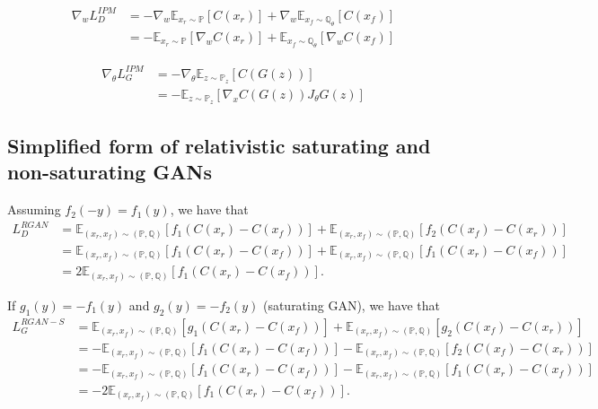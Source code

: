 \documentclass{article}
\begin{document}
\begin{align*}
\nabla_{w}L_D^{IPM} &= -\nabla_{w} \mathbb{E}_{x_r \sim \mathbb{P}} [C(x_r)] + \nabla_{w} \mathbb{E}_{x_f \sim \mathbb{Q_\theta}}[C(x_f)] \\
&= -\mathbb{E}_{x_r \sim \mathbb{P}} [\nabla_{w}C(x_r)] + \mathbb{E}_{x_f \sim \mathbb{Q_\theta}}[\nabla_{w}C(x_f)]
\end{align*}

\begin{align*}
\nabla_{\theta}L_G^{IPM} &= - \nabla_{\theta} \mathbb{E}_{z \sim \mathbb{P}_z}[C(G(z))] \\
&= - \mathbb{E}_{z \sim \mathbb{P}_z}[\nabla_{x} C(G(z)) J_{\theta} G(z)]
\end{align*}

\subsection{Simplified form of relativistic saturating and non-saturating GANs}

Assuming $f_2(-y)=f_1(y)$, we have that
\begin{align*}
L_D^{RGAN} &= \mathbb{E}_{(x_r,x_f) \sim (\mathbb{P},\mathbb{Q})}\left[ f_1(C(x_r)-C(x_f)) \right] + \mathbb{E}_{(x_r,x_f) \sim (\mathbb{P},\mathbb{Q})} \left[ f_2(C(x_f)-C(x_r)) \right] \\
&= \mathbb{E}_{(x_r,x_f) \sim (\mathbb{P},\mathbb{Q})}\left[ f_1(C(x_r)-C(x_f)) \right] + \mathbb{E}_{(x_r,x_f) \sim (\mathbb{P},\mathbb{Q})} \left[ f_1(C(x_r)-C(x_f)) \right] \\
&= 2\mathbb{E}_{(x_r,x_f) \sim (\mathbb{P},\mathbb{Q})}\left[ f_1(C(x_r)-C(x_f)) \right].
\end{align*}

If $g_1(y)=-f_1(y)$ and $g_2(y)=-f_2(y)$ (saturating GAN), we have that
\begin{align*}
L_G^{RGAN-S} &= \mathbb{E}_{(x_r,x_f) \sim (\mathbb{P},\mathbb{Q})}\left[ g_1(C(x_r)-C(x_f)) \right] + \mathbb{E}_{(x_r,x_f) \sim (\mathbb{P},\mathbb{Q})}\left[ g_2(C(x_f)-C(x_r)) \right] \\
&= -\mathbb{E}_{(x_r,x_f) \sim (\mathbb{P},\mathbb{Q})}\left[f_1(C(x_r)-C(x_f)) \right] - \mathbb{E}_{(x_r,x_f) \sim (\mathbb{P},\mathbb{Q})}\left[f_2(C(x_f)-C(x_r)) \right] \\
&= -\mathbb{E}_{(x_r,x_f) \sim (\mathbb{P},\mathbb{Q})}\left[f_1(C(x_r)-C(x_f)) \right] - \mathbb{E}_{(x_r,x_f) \sim (\mathbb{P},\mathbb{Q})}\left[f_1(C(x_r)-C(x_f)) \right] \\
&= -2\mathbb{E}_{(x_r,x_f) \sim (\mathbb{P},\mathbb{Q})}\left[f_1(C(x_r)-C(x_f)) \right].
\end{align*}
\end{document}

